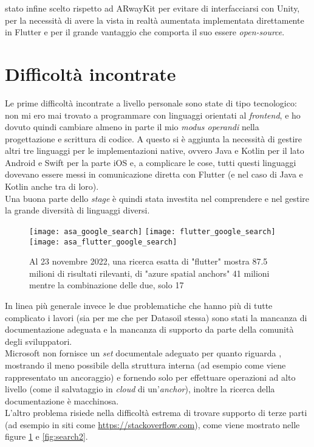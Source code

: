 \e stato infine scelto \aplug{} rispetto ad ARwayKit per evitare di interfacciarsi con Unity, per la necessità di avere la vista in realtà aumentata implementata direttamente in Flutter e per il grande vantaggio che comporta il suo essere \textit{open-source}.

\section{Difficoltà incontrate}
\label{sec:difficolta_incontrate}
Le prime difficoltà incontrate a livello personale sono state di tipo tecnologico: non mi ero mai trovato a programmare con linguaggi orientati al \textit{frontend}, e ho dovuto quindi cambiare almeno in parte il mio \textit{modus operandi} nella progettazione e scrittura di codice. A questo si è aggiunta la necessità di gestire altri tre linguaggi per le implementazioni native, ovvero Java e Kotlin per il lato Android e Swift per la parte iOS e, a complicare le cose, tutti questi linguaggi dovevano essere messi in comunicazione diretta con Flutter (e nel caso di Java e Kotlin anche tra di loro).\\ 
Una buona parte dello \textit{stage} è quindi stata investita nel comprendere e nel gestire la grande diversità di linguaggi diversi.

\begin{figure}[H]
  \centering
  \texttt{[image: asa\_google\_search]}\hfill
  \texttt{[image: flutter\_google\_search]}\\
  \texttt{[image: asa\_flutter\_google\_search]}
  \caption[Ricerca esatta Flutter e ASA 23 novembre]{Al 23 novembre 2022, una ricerca esatta di "flutter" mostra 87.5 milioni di risultati rilevanti, di "azure spatial anchors" 41 milioni mentre la combinazione delle due, solo 17}
\label{fig:search1}
\end{figure}

In linea più generale invece le due problematiche che hanno più di tutte complicato i lavori (sia per me che per Datasoil stessa) sono stati la mancanza di documentazione adeguata e la mancanza di supporto da parte della comunità degli sviluppatori.\\
Microsoft non fornisce un \textit{set} documentale adeguato per quanto riguarda \asa{}, mostrando il meno possibile della struttura interna (ad esempio come viene rappresentato un ancoraggio) e fornendo solo \api{} per effettuare operazioni ad alto livello (come il salvataggio in \textit{cloud} di un'\textit{anchor}), inoltre la ricerca della documentazione è macchinosa.\\
L'altro problema risiede nella difficoltà estrema di trovare supporto di terze parti (ad esempio in siti come \url{https://stackoverflow.com}), come viene mostrato nelle figure \ref{fig:search1} e \ref{fig:search2}.

